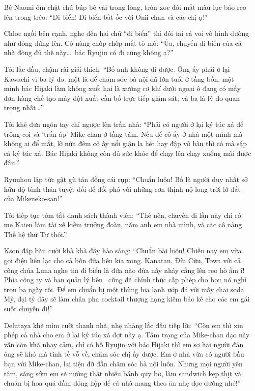 \documentclass[../main.tex]{subfiles}
\begin{document}
Bé Naomi ôm chặt chú búp bê vải trong lòng, tròn xoe đôi mắt màu lục bảo reo lên trong trẻo: ``Đi biển! Đi biển bắt ốc với Onii-chan và các chị ạ!''

Chloe ngồi bên cạnh, nghe đến hai chữ ``đi biển'' thì đôi tai cá voi vô hình dường như dỏng đứng lên. Cô nàng chớp chớp mắt tò mò: ``Ủa, chuyến đi biển của cả nhà đông đủ thế này\dots\ bác Ryujin có đi cùng không ạ?''

Tôi lắc đầu, chậm rãi giải thích: ``Bố anh không đi được. Ông ấy phải ở lại Kawachi vì ba lý do: một là để chăm sóc bà nội đã lớn tuổi ở tầng bốn, một mình bác Hijaki làm không xuể; hai là xưởng cơ khí dưới ngoại ô đang có mấy đơn hàng chế tạo máy đột xuất cần bố trực tiếp giám sát; và ba là lý do quan trọng nhất\dots''

Tôi khẽ đưa ngón tay chỉ ngược lên trần nhà: ``Phải có người ở lại ký túc xá để trông coi và `trấn áp' Mike-chan ở tầng tám. Nếu để cô ấy ở nhà một mình mà không ai để mắt, lỡ nửa đêm cô ấy nổi giận la hét hay đập vỡ bàn thì có mà sập cả ký túc xá. Bác Hijaki không còn đủ sức khỏe để chạy lên chạy xuống mãi được đâu.''

Ryuuhou lập tức gật gù tán đồng cái rụp: ``Chuẩn luôn! Bố là người duy nhất sở hữu độ bình thản tuyệt đối để đối phó với những cơn thịnh nộ long trời lở đất của Mikeneko-san!''

Tôi tiếp tục tóm tắt danh sách thành viên: ``Thế nên, chuyến đi lần này chỉ có mẹ Kaien làm tài xế kiêm trưởng đoàn, năm anh em nhà mình, và các cô nàng Thế hệ thứ Tư thôi.''

Kson đập bàn cười khà khà đầy hào sảng: ``Chuẩn bài luôn! Chiều nay em vừa gọi điện liên lạc cho cả bốn đứa bên kia xong. Kanatan, Đùi Cừu, Towa với cả công chúa Luna nghe tin đi biển là đứa nào đứa nấy nhảy cẫng lên reo hò ầm ĩ! Phía công ty và ban quản lý bên \hll\ cũng đã chính thức cấp phép cho bọn nó nghỉ trọn ba ngày rồi. Để em chuẩn bị một thùng bia lạnh ướp đá với mấy chai soda Mỹ, đại tỷ đây sẽ làm chân pha cocktail thượng hạng kiêm bảo kê cho các em gái suốt chuyến đi!''

Delutaya khẽ mỉm cười thanh nhã, nhẹ nhàng lắc đầu tiếp lời: ``Còn em thì xin phép cả nhà cho em ở lại ký túc xá đợt này ạ. Tâm trạng của Mike-chan dạo này vẫn còn khá nhạy cảm, chỉ có bố Ryujin với bác Hijaki thì em sợ hai người đàn ông sẽ khó mà tinh tế vỗ về, chăm sóc chị ấy được. Em ở nhà vừa có người bầu bạn với Mike-chan, lại tiện đỡ đần chăm sóc bà nội luôn. Nhưng mọi người yên tâm, sáng sớm em sẽ nướng thật nhiều bánh quy bơ, làm sandwich kẹp thịt và chuẩn bị hoa quả dầm đóng hộp để cả nhà mang theo ăn nhẹ dọc đường nhé!''
\end{document}
